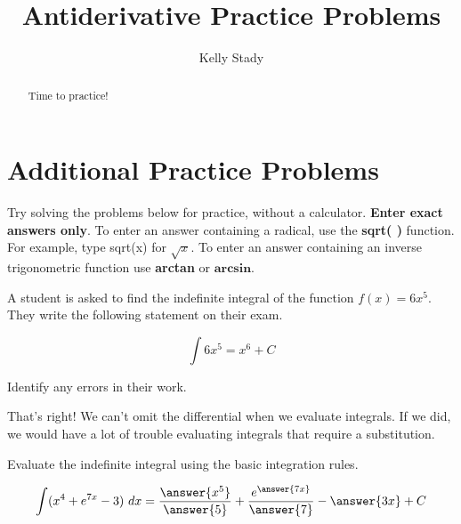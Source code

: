 \documentclass{ximera}
\title{Antiderivative Practice Problems}   %
\author{Kelly Stady}
\begin{document}
\begin{abstract}
    Time to practice!
\end{abstract}
\maketitle
\label{xim:AntiderivEx}

\section*{Additional Practice Problems}

Try solving the problems below for practice, without a calculator.  \textbf{Enter exact answers only}.  To enter an answer
containing a radical, use the \textbf{sqrt( )} function.  For example, type sqrt(x) for $\sqrt{x}.$  To enter an answer containing 
an inverse trigonometric function use \textbf{arctan} or $\textbf{arcsin}.$


\begin{problem}
A student is asked to find the indefinite integral of the function $f(x) = 6x^5.$  They write the following statement on their exam.

\[
\int 6x^5 = x^6 + C
\]

Identify any errors in their work.

\begin{multipleChoice}
\end{multipleChoice}


\begin{feedback}[correct]
    That's right!  We can't omit the differential when we evaluate integrals.  If we did, we would have a lot of trouble evaluating
    integrals that require a substitution. 
\end{feedback} 
\end{problem}


\begin{problem}
Evaluate the indefinite integral using the basic integration rules.


\[
\int (x^4 + e^{7x} - 3) \ dx = \frac{ \answer{x^5} }{ \answer{5} } + \frac{ e^{\answer{7x}} }{\answer{7}} - \answer{3x}  + C
\]

\end{problem}
\end{document}

